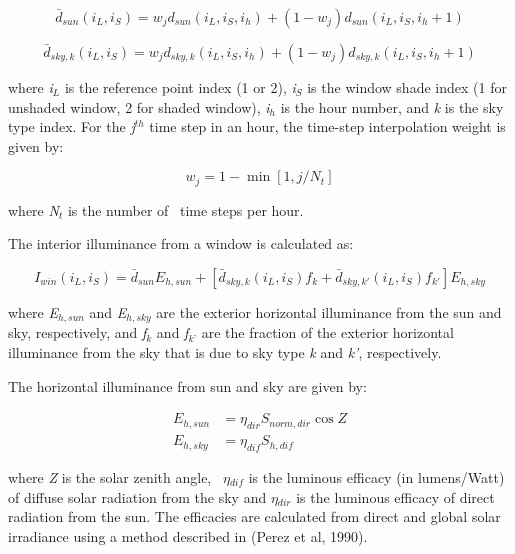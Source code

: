 \begin{equation}
{\bar d_{sun}}({i_L},{i_S}) = {w_j}{d_{sun}}({i_L},{i_S},{i_h}) + (1 - {w_j}){d_{sun}}({i_L},{i_S},{i_h} + 1)
\end{equation}

\begin{equation}
{\bar d_{sky,k}}({i_L},{i_S}) = {w_j}{d_{sky,k}}({i_L},{i_S},{i_h}) + (1 - {w_j}){d_{sky,k}}({i_L},{i_S},{i_h} + 1)
\end{equation}

where \emph{i\(_{L}\)} is the reference point index (1 or 2), \emph{i\(_{S}\)} is the window shade index (1 for unshaded window, 2 for shaded window), \emph{i\(_{h}\)} is the hour number, and \emph{k} is the sky type index. For the \emph{j\(^{th}\)} time step in an hour, the time-step interpolation weight is given by:

\begin{equation}
{w_j} = 1 - \min [1,j/{N_t}]
\end{equation}

where \emph{N\(_{t}\)} is the number of~ time steps per hour.

The interior illuminance from a window is calculated as:

\begin{equation}
{I_{win}}({i_L},{i_S}) = {\bar d_{sun}}{E_{h,sun}} + [{\bar d_{sky,k}}({i_L},{i_S}){f_k} + {\bar d_{sky,k'}}({i_L},{i_S}){f_{k'}}]{E_{h,sky}}
\end{equation}

where \emph{E\(_{h,sun}\)} and \emph{E\(_{h,sky}\)} are the exterior horizontal illuminance from the sun and sky, respectively, and \emph{f\(_{k}\)} and \emph{f\(_{k’}\)} are the fraction of the exterior horizontal illuminance from the sky that is due to sky type \emph{k} and \emph{k'}, respectively.

The horizontal illuminance from sun and sky are given by:

\begin{equation}
  \begin{array}{rl}
    E_{h,sun} & = \eta_{dir} S_{norm,dir} \cos Z \\
    E_{h,sky} & = \eta_{dif} S_{h,dif}
  \end{array}
\end{equation}

where \emph{Z} is the solar zenith angle,~ \emph{$\eta$\(_{dif}\)} is the luminous efficacy (in lumens/Watt) of diffuse solar radiation from the sky and \emph{$\eta$\(_{dir}\)} is the luminous efficacy of direct radiation from the sun. The efficacies are calculated from direct and global solar irradiance using a method described in (Perez et al, 1990).

